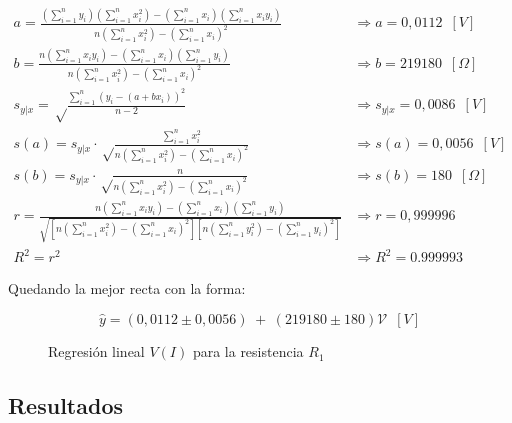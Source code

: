 \documentclass[11pt]{report}
\begin{document}
\begin{refsection}
\begin{center}
\begin{align}
    a = \frac{(\sum^n_{i=1} y_i)(\sum^n_{i=1} x^2_i )-(\sum^n_{i=1} x_i)(\sum^n_{i=1} x_i y_i)}{n(\sum^n_{i=1} x_i^2)-(\sum^n_{i=1} x_i)^2} &\Rightarrow a= 0,0112\hspace{6pt} [V] \label{eq:a1}\\
    b = \frac{n(\sum^n_{i=1} x_i y_i)-(\sum^n_{i=1} x_i)(\sum^n_{i=1} y_i)}{n(\sum^n_{i=1} x_i^2)-(\sum^n_{i=1} x_i)^2} &\Rightarrow b= 219180 \hspace{6pt}[\Omega] \label{eq:b1}\\
    s_{y|x} =\sqrt\frac{\sum^n_{i=1}(y_i-(a+b x_i))^2}{n-2} &\Rightarrow s_{y|x}= 0,0086 \hspace{6pt}[V] \label{eq:s1}\\
    s(a) =s_{y|x} \cdot \sqrt\frac{\sum^n_{i=1}x_i^2}{n(\sum^n_{i=1} x_i^2)-(\sum^n_{i=1} x_i)^2} &\Rightarrow s(a)= 0,0056 \hspace{6pt}[V] \label{eq:s1a}\\
    s(b) =s_{y|x} \cdot \sqrt\frac{n}{n(\sum^n_{i=1} x_i^2)-(\sum^n_{i=1} x_i)^2} &\Rightarrow s(b) = 180 \hspace{6pt}[\Omega] \label{eq:s1b}\\
    r = \frac{n(\sum^n_{i=1} x_i y_i)-(\sum^n_{i=1} x_i)(\sum^n_{i=1} y_i)}{\sqrt{[n(\sum^n_{i=1} x_i^2)-(\sum^n_{i=1} x_i)^2][n(\sum^n_{i=1} y_i^2)-(\sum^n_{i=1} y_i)^2]}}&\Rightarrow r= 0,999996\label{eq:R1}\\
    R^2 =r^2&\Rightarrow R^2=0.999993 \label{eq:R12}
\end{align}
\end{center}

Quedando la mejor recta con la forma:

\begin{equation}
    \hat{y}= (0,0112 \pm 0,0056)\hspace{3pt}+ \hspace{3pt}(219180 \pm 180)\mathscr{V} \hspace{6pt} [V]
\end{equation}

\begin{figure}[H]
    \begin{center}
        
    \end{center}
    \caption{Regresión lineal $V(I)$ para la resistencia $R_1$}
\end{figure}

\subsection{Resultados}
\label{sec:1.3}


\end{refsection}
\end{document}
